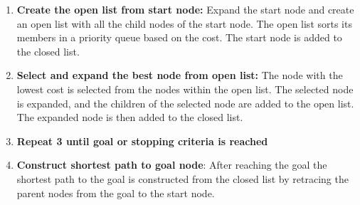 \begin{enumerate}
\item \textbf{Create the open list from start node:} Expand the start node and create an open list with all the child nodes of the start node. The open list sorts its members in a priority queue based on the cost. The start node is added to the closed list.
\item \textbf{Select and expand the best node from open list:} The node with the lowest cost is selected from the nodes within the open list. The selected node is expanded, and the children of the selected node are added to the open list. The expanded node is then added to the closed list.
\item \textbf{Repeat 3 until goal or stopping criteria is reached}
\item \textbf{Construct shortest path to goal node}: After reaching the goal the shortest path to the goal is constructed from the closed list by retracing the parent nodes from the goal to the start node.
\end{enumerate}